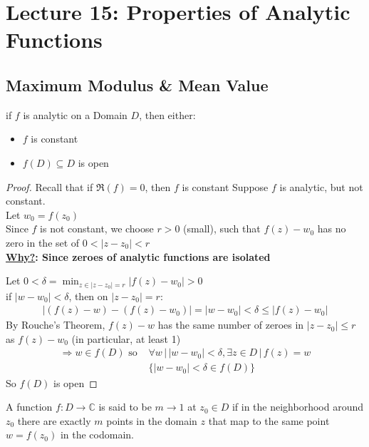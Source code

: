 \chapter{Lecture 15: Properties of Analytic Functions}

\section{Maximum Modulus \& Mean Value}

\begin{theorem}
    if $f$ is analytic on a Domain $D$, then either:
    \begin{itemize}
        \item $f$ is constant
        \item $f(D) \subseteq D$ is open
    \end{itemize}
\end{theorem}

\begin{proof}
    Recall that if $\Re(f) =  0$, then $f$ is constant
    Suppose $f$ is analytic, but not constant.\\
    Let $w_0 = f(z_0)$\\
    Since $f$ is not constant, we choose $r > 0$ (small), such that $f(z) - w_0$ has no zero in the set of $0 < |z -z_0| < r$\\
    \textbf{\underline{Why?}: Since zeroes of analytic functions are isolated}

    Let $0 < \delta = \min_{z \in |z - z_0|  = r} |f (z) - w_0| > 0$\\
    if $|w - w_0| < \delta$, then on $|z - z_0|  = r$:
    \begin{align*}
        |(f (z) - w) - (f(z) - w_0)| = |w- w_0| < \delta \leq |f(z) - w_0|
    \end{align*}
    By Rouche's Theorem, $f(z) - w$ has the same number of zeroes in $|z - z_0| \leq r$ as $f(z) - w_0$  (in particular, at least 1)
    \begin{align*}
        \Rightarrow w \in f(D) \text{ so } & \forall w \,| \,|w - w_0| < \delta, \exists z \in D \, | \, f(z)  = w \\
                                           & \{|w - w_0| < \delta  \in f(D)\}
    \end{align*}
    So $f(D)$ is open
\end{proof}

\begin{definition}
    [Mapping]
    A function $f: D \to \mathbb{C}$ is said to be $m \to 1$ at $z_0 \in D$ if in the neighborhood around $z_0$ there are exactly $m$ points in the domain $z$ that map to the same point $w = f(z_0)$ in the codomain.
\end{definition}

